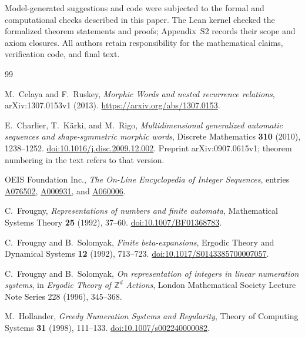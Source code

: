 \documentclass[11pt,a4paper]{article}
\numberwithin{equation}{section}
\theoremstyle{remark}
\begin{document}
Model-generated suggestions and code were subjected to the formal and
computational checks described in this paper. The Lean kernel checked the
formalized theorem statements and proofs; Appendix~S2 records their scope
and axiom closures.
All authors retain responsibility for the mathematical claims, verification
code, and final text.
\endgroup

\appendix
\renewcommand{\thesection}{S\arabic{section}}
\renewcommand{\thetable}{S\arabic{table}}
\renewcommand{\theHtable}{appendix.S\arabic{table}}
\setcounter{table}{0}


\begin{thebibliography}{99}
\small
\raggedright
{}
M.~Celaya and F.~Ruskey,
\emph{Morphic Words and nested recurrence relations},
arXiv:1307.0153v1 (2013).
\url{https://arxiv.org/abs/1307.0153}.

E.~Charlier, T.~K\"arki, and M.~Rigo,
\emph{Multidimensional generalized automatic sequences and shape-symmetric
morphic words}, Discrete Mathematics \textbf{310} (2010), 1238--1252.
\href{https://doi.org/10.1016/j.disc.2009.12.002}{doi:10.1016/j.disc.2009.12.002}.
Preprint arXiv:0907.0615v1; theorem numbering in the text refers to that version.

OEIS Foundation Inc.,
\emph{The On-Line Encyclopedia of Integer Sequences}, entries
\href{https://oeis.org/A076502}{A076502},
\href{https://oeis.org/A000931}{A000931}, and
\href{https://oeis.org/A060006}{A060006}.

C.~Frougny,
\emph{Representations of numbers and finite automata},
Mathematical Systems Theory \textbf{25} (1992), 37--60.
\href{https://doi.org/10.1007/BF01368783}{doi:10.1007/BF01368783}.

C.~Frougny and B.~Solomyak,
\emph{Finite beta-expansions},
Ergodic Theory and Dynamical Systems \textbf{12} (1992), 713--723.
\href{https://doi.org/10.1017/S0143385700007057}{doi:10.1017/S0143385700007057}.

C.~Frougny and B.~Solomyak,
\emph{On representation of integers in linear numeration systems},
in \emph{Ergodic Theory of $\mathbb{Z}^d$ Actions}, London Mathematical
Society Lecture Note Series 228 (1996), 345--368.

M.~Hollander,
\emph{Greedy Numeration Systems and Regularity},
Theory of Computing Systems \textbf{31} (1998), 111--133.
\href{https://doi.org/10.1007/s002240000082}{doi:10.1007/s002240000082}.


\end{thebibliography}
\end{document}
